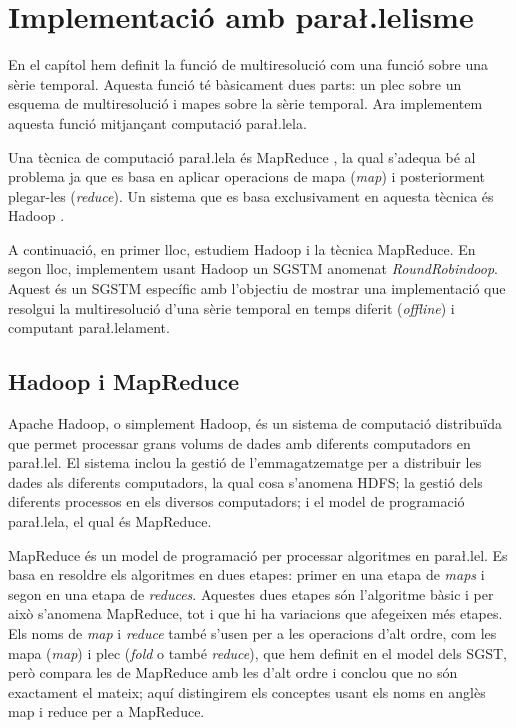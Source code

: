 \chapter{Implementació amb para\l.lelisme}

En el capítol  hem definit la funció de
multiresolució com una funció sobre una sèrie temporal. Aquesta funció
té bàsicament dues parts: un plec sobre un esquema de multiresolució i
mapes sobre la sèrie temporal. Ara implementem
aquesta funció mitjançant computació para\l.lela.


Una tècnica de computació para\l.lela és
MapReduce \parencite{deanghemawat04:mapreduce}, la qual s'adequa bé al
problema ja que es basa en aplicar operacions de mapa (\emph{map}) i
posteriorment plegar-les (\emph{reduce}). Un sistema que es basa
exclusivament en aquesta tècnica és
Hadoop \parencite{hadoop}.

A continuació, en primer lloc, estudiem Hadoop i la tècnica MapReduce.
En segon lloc, implementem usant Hadoop un \gls{SGSTM} anomenat
\emph{RoundRobindoop}. Aquest és un \gls{SGSTM} específic amb
l'objectiu de mostrar una implementació que resolgui la multiresolució
d'una sèrie temporal en temps diferit (\emph{offline}) i computant
para\l.lelament.




\section{Hadoop i MapReduce}


Apache Hadoop, o simplement Hadoop, \parencite{hadoop} és un sistema
de computació distribuïda que permet processar grans volums de dades
amb diferents computadors en para\l.lel. El sistema inclou la gestió
de l'emmagatzematge per a distribuir les dades als diferents
computadors, la qual cosa s'anomena \gls{HDFS}; la gestió dels
diferents processos en els diversos computadors; i el model de
programació para\l.lela, el qual és MapReduce.


MapReduce \parencite{deanghemawat04:mapreduce,lammel08:mapreduce} és
un model de programació per processar algoritmes en para\l.lel. Es
basa en resoldre els algoritmes en dues etapes: primer en una etapa de
\emph{maps} i segon en una etapa de \emph{reduces}.  Aquestes dues
etapes són l'algoritme bàsic i per això s'anomena MapReduce, tot i que
hi ha variacions que afegeixen més etapes.  Els noms de \emph{map} i
\emph{reduce} també s'usen per a les operacions d'alt ordre, com les
mapa (\emph{map}) i plec (\emph{fold} o també \emph{reduce}), que hem
definit en el model dels \gls{SGST}, però
\textcite{lammel08:mapreduce} compara les de MapReduce amb les d'alt
ordre i conclou que no són exactament el mateix; aquí distingirem els
conceptes usant els noms en anglès map i reduce per a MapReduce.



